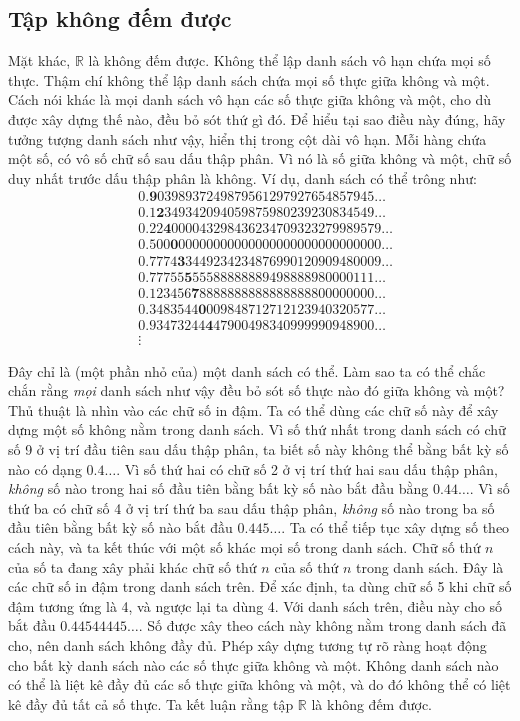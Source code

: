 \subsection{Tập không đếm được}

Mặt khác, $\mathbb{R}$ là không đếm được. Không thể lập danh sách vô hạn chứa mọi số thực. Thậm chí không thể lập danh sách chứa mọi số thực giữa không và một. Cách nói khác là mọi danh sách vô hạn các số thực giữa không và một, cho dù được xây dựng thế nào, đều bỏ sót thứ gì đó. Để hiểu tại sao điều này đúng, hãy tưởng tượng danh sách như vậy, hiển thị trong cột dài vô hạn. Mỗi hàng chứa một số, có vô số chữ số sau dấu thập phân. Vì nó là số giữa không và một, chữ số duy nhất trước dấu thập phân là không. Ví dụ, danh sách có thể trông như:
\begin{align*}
&0.\mathbf{9}0398937249879561297927654857945\ldots \\
&0.1\mathbf{2}349342094059875980239230834549\ldots \\
&0.22\mathbf{4}000043298436234709323279989579\ldots \\
&0.500\mathbf{0}00000000000000000000000000000\ldots \\
&0.7774\mathbf{3}3449234234876990120909480009\ldots \\
&0.77755\mathbf{5}55588888889498888980000111\ldots \\
&0.123456\mathbf{7}8888888888888888800000000\ldots \\
&0.3483544\mathbf{0}009848712712123940320577\ldots \\
&0.93473244\mathbf{4}47900498340999990948900\ldots \\
&\vdots
\end{align*}

Đây chỉ là (một phần nhỏ của) một danh sách có thể. Làm sao ta có thể chắc chắn rằng \emph{mọi} danh sách như vậy đều bỏ sót số thực nào đó giữa không và một? Thủ thuật là nhìn vào các chữ số in đậm. Ta có thể dùng các chữ số này để xây dựng một số không nằm trong danh sách. Vì số thứ nhất trong danh sách có chữ số 9 ở vị trí đầu tiên sau dấu thập phân, ta biết số này không thể bằng bất kỳ số nào có dạng $0.4\ldots$. Vì số thứ hai có chữ số 2 ở vị trí thứ hai sau dấu thập phân, \emph{không} số nào trong hai số đầu tiên bằng bất kỳ số nào bắt đầu bằng $0.44\ldots$. Vì số thứ ba có chữ số 4 ở vị trí thứ ba sau dấu thập phân, \emph{không} số nào trong ba số đầu tiên bằng bất kỳ số nào bắt đầu $0.445\ldots$. Ta có thể tiếp tục xây dựng số theo cách này, và ta kết thúc với một số khác mọi số trong danh sách. Chữ số thứ $n$ của số ta đang xây phải khác chữ số thứ $n$ của số thứ $n$ trong danh sách. Đây là các chữ số in đậm trong danh sách trên. Để xác định, ta dùng chữ số 5 khi chữ số đậm tương ứng là 4, và ngược lại ta dùng 4. Với danh sách trên, điều này cho số bắt đầu $0.44544445\ldots$. Số được xây theo cách này không nằm trong danh sách đã cho, nên danh sách không đầy đủ. Phép xây dựng tương tự rõ ràng hoạt động cho bất kỳ danh sách nào các số thực giữa không và một. Không danh sách nào có thể là liệt kê đầy đủ các số thực giữa không và một, và do đó không thể có liệt kê đầy đủ tất cả số thực. Ta kết luận rằng tập $\mathbb{R}$ là không đếm được.

